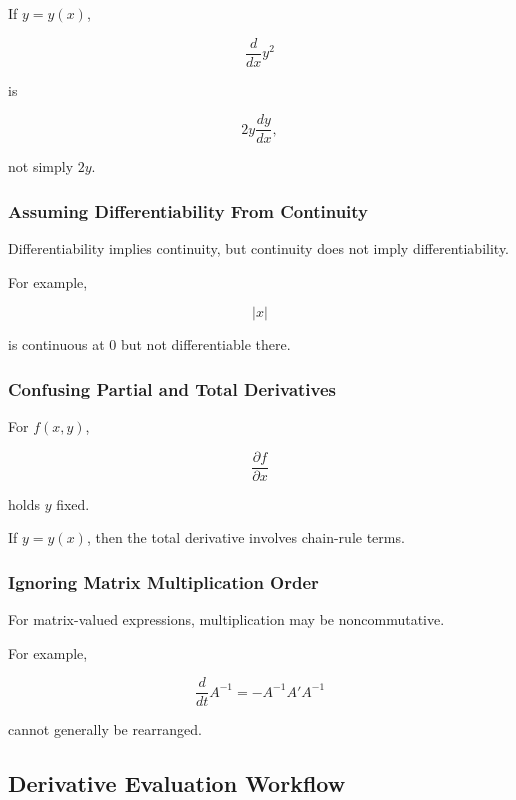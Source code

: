 If \(y=y(x)\),

\[
\frac{d}{dx}y^2
\]

is

\[
\boxed{
2y\frac{dy}{dx},
}
\]

not simply \(2y\).

\subsubsection{Assuming Differentiability From Continuity}

Differentiability implies continuity, but continuity does not imply
differentiability.

For example,

\[
\boxed{
|x|
}
\]

is continuous at \(0\) but not differentiable there.

\subsubsection{Confusing Partial and Total Derivatives}

For \(f(x,y)\),

\[
\frac{\partial f}{\partial x}
\]

holds \(y\) fixed.

If \(y=y(x)\), then the total derivative involves chain-rule terms.

\subsubsection{Ignoring Matrix Multiplication Order}

For matrix-valued expressions, multiplication may be noncommutative.

For example,

\[
\boxed{
\frac{d}{dt}
A^{-1}
=
-A^{-1}A'A^{-1}
}
\]

cannot generally be rearranged.

\subsection{Derivative Evaluation Workflow}
\label{subsec:derivative-evaluation-workflow}

